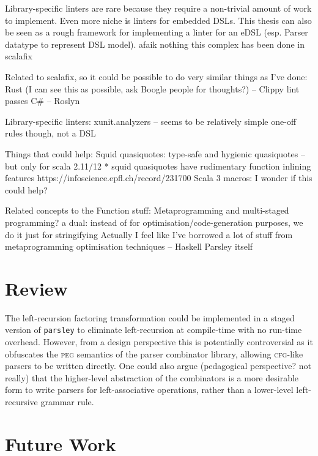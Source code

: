 \documentclass[../../main.tex]{subfiles}
\begin{document}
Library-specific linters are rare because they require a non-trivial amount of work to implement.
Even more niche is linters for embedded DSLs.
This thesis can also be seen as a rough framework for implementing a linter for an eDSL (esp. Parser datatype to represent DSL model).
afaik nothing this complex has been done in scalafix

Related to scalafix, so it could be possible to do very similar things as I've done:
Rust (I can see this as possible, ask Boogle people for thoughts?) -- Clippy lint passes %
C\# -- Roslyn

Library-specific linters:
xunit.analyzers -- seems to be relatively simple one-off rules though, not a DSL

Things that could help:
Squid quasiquotes: type-safe and hygienic quasiquotes -- but only for scala 2.11/12
* squid quasiquotes have rudimentary function inlining features https://infoscience.epfl.ch/record/231700
Scala 3 macros: I wonder if this could help?

Related concepts to the Function stuff:
Metaprogramming and multi-staged programming? a dual: instead of for optimisation/code-generation purposes, we do it just for stringifying
Actually I feel like I've borrowed a lot of stuff from metaprogramming optimisation techniques -- Haskell Parsley itself

\section{Review}
The left-recursion factoring transformation could be implemented in a staged version of \texttt{parsley} to eliminate left-recursion at compile-time with no run-time overhead.
However, from a design perspective this is potentially controversial as it obfuscates the \textsc{peg} semantics of the parser combinator library, allowing \textsc{cfg}-like parsers to be written directly.
One could also argue (pedagogical perspective? not really) that the higher-level abstraction of the  combinators is a more desirable form to write parsers for left-associative operations, rather than a lower-level left-recursive grammar rule.

\section{Future Work}
\end{document}
